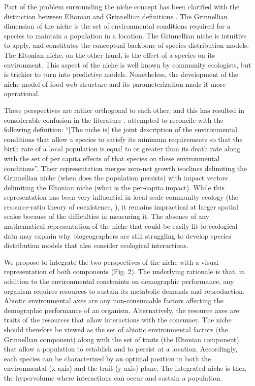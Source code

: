 \documentclass[12pt]{article}
\begin{document}
Part of the problem surrounding the niche concept has been clarified with the
distinction between Eltonian and Grinnellian definitions \citep{Chase2003}. The
Grinnellian dimension of the niche is the set of environmental conditions
required for a species to maintain a population in a location. The Grinnellian
niche is intuitive to apply, and constitutes the conceptual backbone of
species distribution models. The Eltonian niche, on the other hand, is the
effect of a species on its environment. This aspect of the niche is well known
by community ecologists, but is trickier to turn into predictive models.
Nonetheless, the development of the niche model of food web structure
\citep{Williams2000} and its parameterization \citep{Williams2010; Gravel2013}
made it more operational.

These perspectives are rather orthogonal to each other, and this has resulted in
considerable confusion in the literature \citep{McInerny2012a}.
\citealt{Chase2003} attempted to reconcile with the following definition:
``[The niche is] the joint description of the environmental conditions that
allow a species to satisfy its minimum requirements so that the birth rate of
a local population is equal to or greater than its death rate along with the
set of per capita effects of that species on these environmental conditions''.
Their representation merges zero-net growth isoclines delimiting the
Grinnellian niche (when does the population persists) with impact vectors delimiting
the Eltonian niche (what is the per-capita impact). While this representation
has been very influential in local-scale community ecology (the resource-ratio
theory of coexistence, \citealt{Tilman1982}), it remains impractical at larger
spatial scales because of the difficulties in measuring it. The absence of any
mathematical representation of the niche that could be easily fit to
ecological data may explain why biogeographers are still struggling to develop
species distribution models that also consider ecological interactions.

We propose to integrate the two perspectives of the niche with a visual
representation of both components (Fig. 2). The underlying rationale is that, in
addition to the environmental constraints on demographic performance, any
organism requires resources to sustain its metabolic demands and reproduction.
Abiotic environmental axes are any non-consumable factors affecting the
demographic performance of an organism. Alternatively, the resource axes are
traits of the resources that allow interactions with the consumer. The niche
should therefore be viewed as the set of abiotic environmental factors (the
Grinnellian component) along with the set of traits (the Eltonian component)
that allow a population to establish and to persist at a location. Accordingly,
each species can be characterized by an optimal position in both the
environmental (x-axis) and the trait (y-axis) plane. The integrated niche is
then the hypervolume where interactions can occur and sustain a population.
\end{document}
